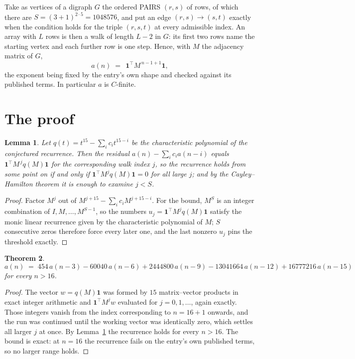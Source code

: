 \documentclass[11pt,a4paper]{article}
\theoremstyle{plain}
\newtheorem{theorem}{Theorem}
\newtheorem{lemma}[theorem]{Lemma}
\theoremstyle{definition}
\begin{document}
Take as vertices of a digraph $G$ the ordered PAIRS $(r,s)$ of rows, of which there are
$S=(3+1)^{2\cdot5}=1048576$, and put an edge $(r,s)\to(s,t)$ exactly when the condition
holds for the triple $(r,s,t)$ at every admissible index. An array with $L$ rows is then a
walk of length $L-2$ in $G$: its first two rows name the starting vertex and each further
row is one step. Hence, with $M$ the adjacency matrix of $G$,
\[
a(n)\;=\;\,\mathbf{1}^{\!\top}M^{\,n-1+1}\mathbf{1},
\]
the exponent being fixed by the entry's own shape and checked against its published terms.
In particular $a$ is $C$-finite.

\section{The proof}

\begin{lemma}\label{lem:crit}
Let $q(t)=t^{15}-\sum_i c_it^{15-i}$ be the characteristic polynomial of the
conjectured recurrence. Then the residual $a(n)-\sum_ic_ia(n-i)$ equals
$\mathbf{1}^{\!\top}M^{\,j}q(M)\mathbf{1}$ for the corresponding walk index
$j$, so the recurrence holds from some point on if and only if
$\mathbf{1}^{\!\top}M^{j}q(M)\mathbf{1}=0$ for all large $j$; and by the
Cayley--Hamilton theorem it is enough to examine $j<S$.
\end{lemma}

\begin{proof}
Factor $M^{j}$ out of $M^{j+15}-\sum_ic_iM^{j+15-i}$. For the bound, $M^{S}$
is an integer combination of $I,M,\dots,M^{S-1}$, so the numbers
$u_j=\mathbf{1}^{\!\top}M^{j}q(M)\mathbf{1}$ satisfy the monic linear recurrence given by
the characteristic polynomial of $M$; $S$ consecutive zeros therefore force every later one,
and the last nonzero $u_j$ pins the threshold exactly.
\end{proof}

\begin{theorem}
\[
a(n)\;=\;454\,a(n-3) - 60040\,a(n-6) + 2444800\,a(n-9) - 13041664\,a(n-12) + 16777216\,a(n-15)
\]
for every $n>16$.
\end{theorem}

\begin{proof}
The vector $w=q(M)\mathbf{1}$ was formed by $15$ matrix--vector products in exact
integer arithmetic and $\mathbf{1}^{\!\top}M^{j}w$ evaluated for $j=0,1,\dots$, again
exactly. Those integers vanish from the index corresponding to $n=16+1$ onwards, and the
run was continued until the working vector was identically zero, which settles all larger $j$
at once. By Lemma~\ref{lem:crit} the recurrence holds for every $n>16$. The bound is exact: at $n=16$ the recurrence fails on the entry's own published terms, so no larger range holds.
\end{proof}
\end{document}

